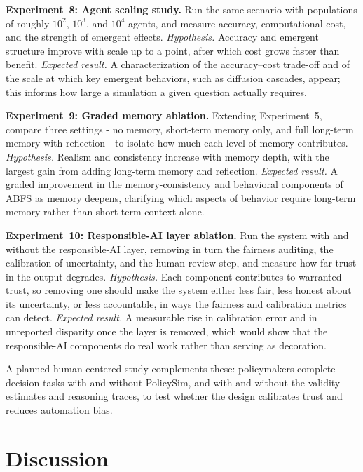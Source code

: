 \documentclass[conference]{IEEEtran}
\begin{document}
\textbf{Experiment~8: Agent scaling study.}
Run the same scenario with populations of roughly $10^2$, $10^3$, and $10^4$ agents, and measure accuracy, computational cost, and the strength of emergent effects.
\emph{Hypothesis.} Accuracy and emergent structure improve with scale up to a point, after which cost grows faster than benefit.
\emph{Expected result.} A characterization of the accuracy--cost trade-off and of the scale at which key emergent behaviors, such as diffusion cascades, appear; this informs how large a simulation a given question actually requires.

\textbf{Experiment~9: Graded memory ablation.}
Extending Experiment~5, compare three settings - no memory, short-term memory only, and full long-term memory with reflection - to isolate how much each level of memory contributes.
\emph{Hypothesis.} Realism and consistency increase with memory depth, with the largest gain from adding long-term memory and reflection.
\emph{Expected result.} A graded improvement in the memory-consistency and behavioral components of ABFS as memory deepens, clarifying which aspects of behavior require long-term memory rather than short-term context alone.

\textbf{Experiment~10: Responsible-AI layer ablation.}
Run the system with and without the responsible-AI layer, removing in turn the fairness auditing, the calibration of uncertainty, and the human-review step, and measure how far trust in the output degrades.
\emph{Hypothesis.} Each component contributes to warranted trust, so removing one should make the system either less fair, less honest about its uncertainty, or less accountable, in ways the fairness and calibration metrics can detect.
\emph{Expected result.} A measurable rise in calibration error and in unreported disparity once the layer is removed, which would show that the responsible-AI components do real work rather than serving as decoration.

A planned human-centered study complements these: policymakers complete decision tasks with and without PolicySim, and with and without the validity estimates and reasoning traces, to test whether the design calibrates trust and reduces automation bias.

\section{Discussion}
\end{document}
